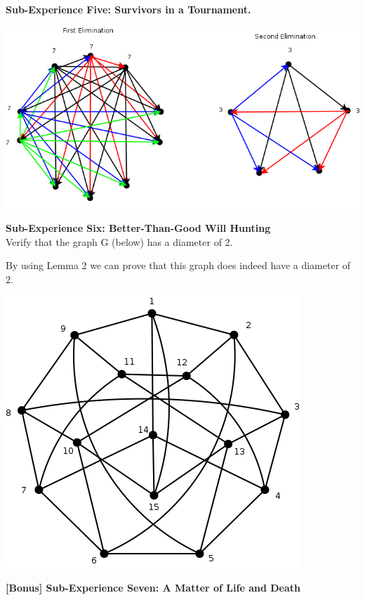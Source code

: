 \documentclass[10pt,a4paper]{report}
\begin{document}
		\begin{center}
	
		\end{center}
	\textbf{Sub-Experience Five: Survivors in a Tournament.}\\
	
		\begin{center}
			\includegraphics[scale=.5]{e5.png}
			\newline
			\newline
		\end{center}
	\textbf{Sub-Experience Six: Better-Than-Good Will Hunting}\\
		Verify that the graph G (below) has a diameter of 2.
	
		By using Lemma 2 we can prove that this graph does indeed have a diameter of 2.  
		\begin{center}
			\includegraphics[scale=.5]{e6.png}
			\newline
			\newline
		\end{center}
	\textbf{[Bonus] Sub-Experience Seven: A Matter of Life and Death}\\	
	
		\begin{center}

		\end{center}
\end{document}

